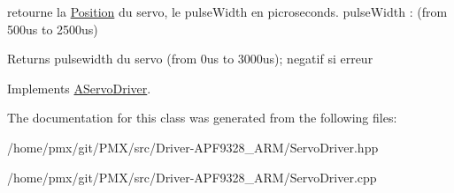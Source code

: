 retourne la \hyperlink{structPosition}{Position} du servo, le pulse\+Width en picroseconds. pulse\+Width \+: (from 500us to 2500us) 

\begin{DoxyReturn}{Returns}
pulsewidth du servo (from 0us to 3000us); negatif si erreur 
\end{DoxyReturn}


Implements \hyperlink{classAServoDriver}{A\+Servo\+Driver}.



The documentation for this class was generated from the following files\+:\begin{DoxyCompactItemize}
\item 
/home/pmx/git/\+P\+M\+X/src/\+Driver-\/\+A\+P\+F9328\+\_\+\+A\+R\+M/Servo\+Driver.\+hpp\item 
/home/pmx/git/\+P\+M\+X/src/\+Driver-\/\+A\+P\+F9328\+\_\+\+A\+R\+M/Servo\+Driver.\+cpp\end{DoxyCompactItemize}
